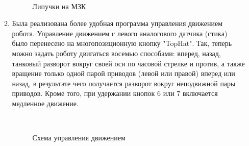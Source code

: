\begin{enumerate}
\begin{enumerate}
\begin{figure}[H]
\begin{minipage}[h]{0.29\linewidth}
			\end{minipage}
			\hfill
			\begin{minipage}[h]{0.1\linewidth}
				\center  
			\end{minipage}
			\caption{Липучки на МЗК}
		\end{figure}
		
        \item Была реализована более удобная программа управления движением робота. Управление движением с левого аналогового датчика (стика) было перенесено на многопозиционную кнопку "TopHat". Так, теперь можно задать роботу двигаться восемью способами: вперед, назад, танковый разворот вокруг своей оси по часовой стрелке и против, а также вращение только одной парой приводов (левой или правой) вперед или назад, в результате чего получается разворот вокруг неподвижной пары приводов. Кроме того, при удержании кнопок 6 или 7 включается медленное движение.
		
        \begin{figure}[H]
	  	  \begin{minipage}[h]{0.2\linewidth}
	  		\center  
	  	  \end{minipage}
	  	  \begin{minipage}[h]{0.6\linewidth}
	  		\caption{Схема управления движением}
	  	  \end{minipage}
	   \end{figure}
	   

\end{enumerate}
\end{enumerate}
